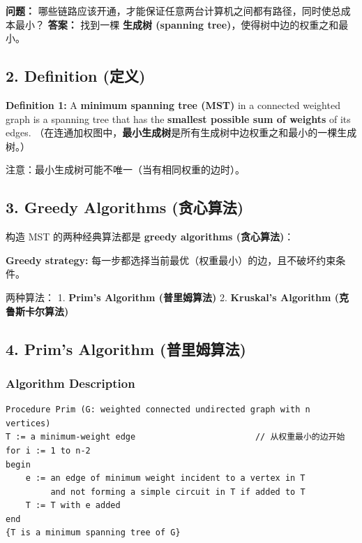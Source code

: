 \documentclass[10pt,a4paper,openany]{ctexbook}
\theoremstyle{definition}
\theoremstyle{remark}
\renewenvironment{quote}
  {\list{}{\leftmargin=1em\rightmargin=0pt\topsep=0.5pt\partopsep=0pt}\item[]}
  {\endlist}
\begin{document}
\textbf{问题：} 哪些链路应该开通，才能保证任意两台计算机之间都有路径，同时使总成本最小？
\textbf{答案：} 找到一棵 \textbf{生成树 (spanning tree)}，使得树中边的权重之和最小。
\vspace{-2pt}

\subsection{2. Definition (定义)}

\textbf{Definition 1:} A \textbf{minimum spanning tree (MST)} in a connected weighted graph is a spanning tree that has the \textbf{smallest possible sum of weights} of its edges.
（在连通加权图中，\textbf{最小生成树}是所有生成树中边权重之和最小的一棵生成树。）
\begin{quote}
注意：最小生成树可能不唯一（当有相同权重的边时）。

\end{quote}
\vspace{-2pt}

\subsection{3. Greedy Algorithms (贪心算法)}

构造 MST 的两种经典算法都是 \textbf{greedy algorithms (贪心算法)}：
\begin{quote}
\textbf{Greedy strategy:} 每一步都选择当前最优（权重最小）的边，且不破坏约束条件。

两种算法：
1. \textbf{Prim's Algorithm (普里姆算法)}
2. \textbf{Kruskal's Algorithm (克鲁斯卡尔算法)}

\end{quote}
\vspace{-2pt}

\subsection{4. Prim's Algorithm (普里姆算法)}

\subsubsection{Algorithm Description}

{\footnotesize\begin{verbatim}
Procedure Prim (G: weighted connected undirected graph with n vertices)
T := a minimum-weight edge                        // 从权重最小的边开始
for i := 1 to n-2
begin
    e := an edge of minimum weight incident to a vertex in T
         and not forming a simple circuit in T if added to T
    T := T with e added
end
{T is a minimum spanning tree of G}
\end{verbatim}}
\end{document}
